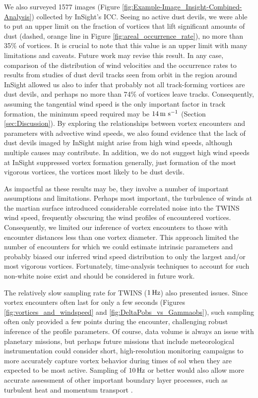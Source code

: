 \documentclass{aastex63}
\begin{document}
We also surveyed 1577 images (Figure \ref{fig:Example-Image_Insight-Combined-Analysis}) collected by InSight's ICC. Seeing no active dust devils, we were able to put an upper limit on the fraction of vortices that lift significant amounts of dust (dashed, orange line in Figure \ref{fig:areal_occurrence_rate}), no more than 35\% of vortices. It is crucial to note that this value is an upper limit with many limitations and caveats. Future work may revise this result. In any case, comparison of the distribution of wind velocities and the occurrence rates to results from studies of dust devil tracks seen from orbit in the region around InSight \citep{2020GeoRL..4787234P} allowed us also to infer that probably not all track-forming vortices are dust devils, and perhaps no more than 74\% of vortices leave tracks. Consequently, assuming the tangential wind speed is the only important factor in track formation, the minimum speed required may be $14\,{\rm m\ s^{-1}}$ (Section \ref{sec:Discussion}). By exploring the relationships between vortex encounters and parameters with advective wind speeds, we also found evidence that the lack of dust devils imaged by InSight might arise from high wind speeds, although multiple causes may contribute. In addition, we do not suggest high wind speeds at InSight suppressed vortex formation generally, just formation of the most vigorous vortices, the vortices most likely to be dust devils.

As impactful as these results may be, they involve a number of important assumptions and limitations. Perhaps most important, the turbulence of winds at the martian surface introduced considerable correlated noise \citep[\emph{cf.}][]{2018RemS...10...65J} into the TWINS wind speed, frequently obscuring the wind profiles of encountered vortices. Consequently, we limited our inference of vortex encounters to those with encounter distances less than one vortex diameter. This approach limited the number of encounters for which we could estimate intrinsic parameters and probably biased our inferred wind speed distribution to only the largest and/or most vigorous vortices. Fortunately, time-analysis techniques to account for such non-white noise exist \citep{hodlr} and should be considered in future work. 

The relatively slow sampling rate for TWINS ($1\,{\rm Hz}$) also presented issues. Since vortex encounters often last for only a few seconds (Figures \ref{fig:vortices_and_windspeed} and \ref{fig:DeltaPobs_vs_Gammaobs}), such sampling often only provided a few points during the encounter, challenging robust inference of the profile parameters. Of course, data volume is always an issue with planetary missions, but perhaps future missions that include meteorological instrumentation could consider short, high-resolution monitoring campaigns to more accurately capture vortex behavior during times of sol when they are expected to be most active. Sampling of $10\,{\rm Hz}$ or better would also allow more accurate assessment of other important boundary layer processes, such as turbulent heat and momentum transport \citep{2011RvGeo..49.3005P}.
\end{document}
